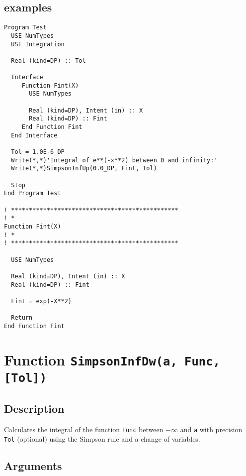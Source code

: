 \subsection{examples}

\begin{lstlisting}[emph=SimpsonInfUP,
                   emphstyle=\color{blue},
                   frame=trBL,
                   caption=Integration of a function between 0 and $\infty$.,
                   label=simpsoninfup]
Program Test
  USE NumTypes
  USE Integration

  Real (kind=DP) :: Tol

  Interface 
     Function Fint(X)
       USE NumTypes

       Real (kind=DP), Intent (in) :: X
       Real (kind=DP) :: Fint
     End Function Fint
  End Interface

  Tol = 1.0E-6_DP
  Write(*,*)'Integral of e**(-x**2) between 0 and infinity:'
  Write(*,*)SimpsonInfUp(0.0_DP, Fint, Tol)

  Stop
End Program Test

! ***********************************************
! *
Function Fint(X)
! *  
! ***********************************************

  USE NumTypes

  Real (kind=DP), Intent (in) :: X
  Real (kind=DP) :: Fint

  Fint = exp(-X**2)

  Return
End Function Fint
\end{lstlisting}


\section{Function \texttt{SimpsonInfDw(a, Func, [Tol])}}

\subsection{Description}

Calculates the integral of the function \texttt{Func} between
$- \infty$ and \texttt{a} with precision \texttt{Tol} (optional) using
the Simpson rule and a change of variables.


\subsection{Arguments}

